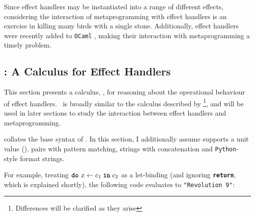 


Since effect handlers may be instantiated into a range of different effects, considering the interaction of metaprogramming with effect handlers is an exercise in killing many birds with a single stone. Additionally, effect handlers were recently added to \texttt{OCaml} \citep{sivaramakrishnan-21}, making their interaction with metaprogramming a timely problem. 
\subsection{\texorpdfstring{\efflang{}}{Lambda-Op}: A Calculus for Effect Handlers}\label{subsection:effect-handler-calculus}
\newcommand{\print}[1]{\texttt{\textbf{print}}(\texttt{#1})}
\newcommand{\readInt}[1]{\texttt{\textbf{read\_int}(#1)}}


This section presents a calculus, \efflang{}, for reasoning about the operational behaviour of effect handlers.\ \efflang{} is broadly similar to the calculus described by \citet{pretnar-15}\footnote{Differences will be clarified as they arise}, and will be used in later sections to study the interaction between effect handlers and metaprogramming. 


 collates the base syntax of \efflang{}. In this section, I additionally assume \efflang{} supports a unit value (), pairs with pattern matching, strings with concatenation and \texttt{Python}-style format strings. 

For example, treating $\texttt{\textbf{do}} \,\, {x} \leftarrow {c_1} \; \textbf{\texttt{in}} \; {c_2}$ as a let-binding (and ignoring \textbf{\texttt{return}}, which is explained shortly), the following code evaluates to \texttt{"Revolution 9"}:

